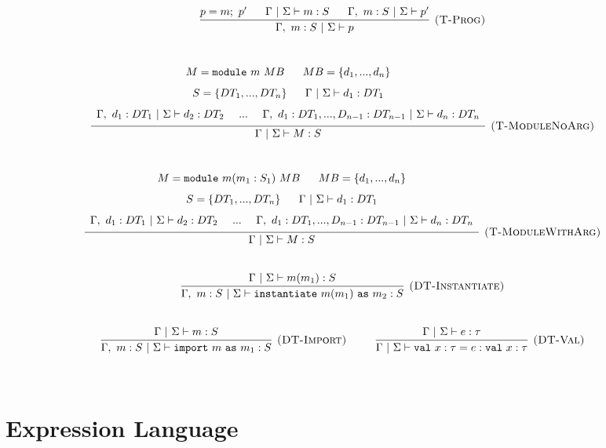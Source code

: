 \documentclass{llncs}
\newcommand{\keyw}[1]{\mathtt{#1}~}
\begin{document}
\[\begin{array}{c}
\infer[\textsc{(T-Prog)}]
  {\Gamma,~m : S~|~\Sigma \vdash p}
  {p = m;~p'~~~~~\Gamma~|~\Sigma \vdash m : S~~~~~\Gamma,~m : S~|~\Sigma \vdash p'}\\[5ex]

\infer[\textsc{(T-ModuleNoArg)}]
  {\Gamma~|~\Sigma \vdash M : S}
  {\def\arraystretch{1.6}
  \begin{array}{c}
M = \keyw{module} m~MB~~~~~MB = \{d_1, ..., d_n\}\\
S = \{DT_1, ..., DT_n\}~~~~~\Gamma~|~\Sigma \vdash d_1 : DT_1 \\
\Gamma,~d_1 : DT_1~|~\Sigma \vdash d_2 : DT_2~~~~...~~~~\Gamma,~d_1 : DT_1, ..., D_{n-1} : DT_{n-1} ~|~\Sigma \vdash d_n : DT_n
  \end{array}}\\[5ex]

\infer[\textsc{(T-ModuleWithArg)}]
  {\Gamma~|~\Sigma \vdash M : S}
  {\def\arraystretch{1.6}
  \begin{array}{c}
M = \keyw{module} m(m_1 : S_1)~MB~~~~~MB = \{d_1, ..., d_n\}\\
S = \{DT_1, ..., DT_n\}~~~~~\Gamma~|~\Sigma \vdash d_1 : DT_1 \\
\Gamma,~d_1 : DT_1~|~\Sigma \vdash d_2 : DT_2~~~~...~~~~\Gamma,~d_1 : DT_1, ..., D_{n-1} : DT_{n-1} ~|~\Sigma \vdash d_n : DT_n
  \end{array}}\\[5ex]

%
%

\infer[\textsc{(DT-Instantiate)}]
  {\Gamma,~m : S~|~\Sigma \vdash \keyw{instantiate} m(m_1)~\keyw{as} m_2 : S}
  {\Gamma~|~\Sigma \vdash m(m_1) : S}\\[5ex]

\infer[\textsc{(DT-Import)}]
  {\Gamma,~m : S~|~\Sigma \vdash \keyw{import} m~\keyw{as} m_1 : S}
  {\Gamma~|~\Sigma \vdash m : S}
~~~~~~~~
\infer[\textsc{(DT-Val)}]
  {\Gamma~|~\Sigma \vdash \keyw{val} x : \tau = e : \keyw{val} x : \tau}
  {\Gamma~|~\Sigma \vdash e : \tau}\\[5ex]

\end{array}
\]

\newpage

\section{Expression Language}
\end{document}

